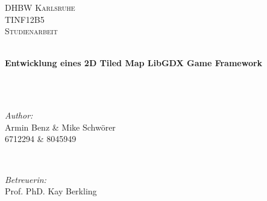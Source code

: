 \begin{titlepage}

\center %
 

\textsc{\LARGE DHBW Karlsruhe}\\[1.5cm] %
\textsc{\Large TINF12B5}\\[0.5cm] %
\textsc{\large Studienarbeit}\\[0.5cm] %


\HRule \\[0.4cm]
{ 
\begin{singlespace}
\huge \bfseries 
Entwicklung eines 2D Tiled Map LibGDX Game Framework
\end{singlespace}
} ~\\[0.4cm] %
\HRule \\[1.5cm]
 

\begin{minipage}{0.4\textwidth}
\begin{flushleft} \large
\emph{Author:}\\
Armin Benz \& Mike Schwörer\\ %
\textsc{6712294 \& 8045949}   %
\end{flushleft}
\end{minipage}
~
\begin{minipage}{0.4\textwidth}
\begin{flushright} \large
\emph{Betreuerin:} \\
Prof. PhD. Kay Berkling \\%
\strut
\end{flushright}
\end{minipage}\\[3cm]


\end{titlepage}
